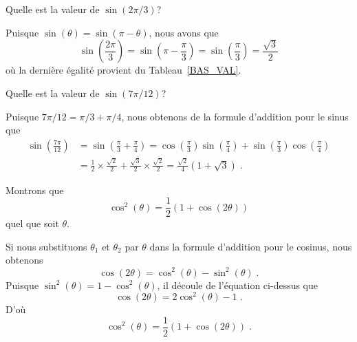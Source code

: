 {\begin{rmk}[\theory]

\label{proof_add}
\end{rmk}

\begin{egg}
Quelle est la valeur de $\displaystyle \sin(2\pi/3)$?

Puisque $\sin(\theta) = \sin(\pi - \theta)$, nous avons que
\[
\sin\left(\frac{2\pi}{3}\right) = \sin\left(\pi - \frac{\pi}{3}\right)
= \sin\left(\frac{\pi}{3}\right) = \frac{\sqrt{3}}{2}
\]
où la dernière égalité provient du Tableau~\ref{BAS_VAL}.
\end{egg}

\begin{egg}
Quelle est la valeur de $\sin(7\pi/12)$?

Puisque $7\pi/12 = \pi/3 + \pi/4$, nous obtenons de la formule d'addition
pour le sinus que
\begin{align*}
\sin\left(\frac{7\pi}{12}\right) &=
\sin\left(\frac{\pi}{3} + \frac{\pi}{4}\right)
= \cos\left(\frac{\pi}{3}\right) \sin\left(\frac{\pi}{4}\right) +
\sin\left(\frac{\pi}{3}\right) \cos\left(\frac{\pi}{4}\right) \\
&= \frac{1}{2} \times \frac{\sqrt{2}}{2} + \frac{\sqrt{3}}{2}
\times \frac{\sqrt{2}}{2}
= \frac{\sqrt{2}}{4} \left( 1 + \sqrt{3}\right) \; .
\end{align*}
\end{egg}

\begin{egg}
Montrons que
\begin{equation}\label{db_angle}
\cos^2(\theta) = \frac{1}{2} \left( 1 + \cos(2\theta) \right)
\end{equation}
quel que soit $\theta$.

Si nous substituons $\theta_1$ et $\theta_2$ par $\theta$ dans la
formule d'addition pour le cosinus, nous obtenons
\[
\cos(2 \theta) = \cos^2(\theta) - \sin^2(\theta) \; .
\]
Puisque $\sin^2(\theta) = 1 - \cos^2(\theta)$, il découle de
l'équation ci-dessus que
\begin{equation} \label{doubleAngle}
\cos(2 \theta) = 2 \cos^2(\theta) - 1 \; .
\end{equation}
D'où
\[
\cos^2(\theta) = \frac{1}{2} \left( 1 + \cos(2\theta) \right) \; .
\]
\end{egg}

}
